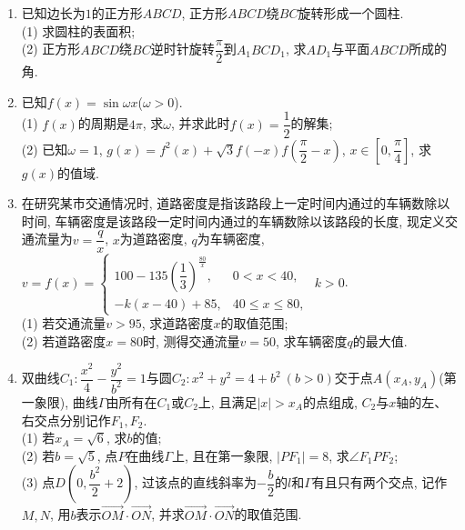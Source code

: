 \documentclass[10pt,a4paper]{article}
\begin{document}
\begin{enumerate}[1.]
\item 已知边长为$1$的正方形$ABCD$, 正方形$ABCD$绕$BC$旋转形成一个圆柱.\\
(1) 求圆柱的表面积;\\
(2) 正方形$ABCD$绕$BC$逆时针旋转$\dfrac{\pi}2$到$A_1BCD_1$, 求$AD_1$与平面$ABCD$所成的角.
\begin{center}
\end{center}
\item 已知$f(x)=\sin\omega x$($\omega>0$).\\
(1) $f(x)$的周期是$4\pi$, 求$\omega$, 并求此时$f(x)=\dfrac12$的解集;\\
(2) 已知$\omega=1$, $g(x)=f^2(x)+\sqrt3f(-x)f(\dfrac{\pi}2-x)$, $x\in [0,\dfrac{\pi}4]$, 求$g(x)$的值域.
\item 在研究某市交通情况时, 道路密度是指该路段上一定时间内通过的车辆数除以时间, 车辆密度是该路段一定时间内通过的车辆数除以该路段的长度, 现定义交通流量为$v=\dfrac qx$, $x$为道路密度, $q$为车辆密度, $v=f(x)=\begin{cases} 100-135(\dfrac13)^{\frac{80}x}, & 0<x<40,  \\ -k(x-40)+85, & 40 \le x\le 80, \end{cases}$ $k>0$.\\
(1) 若交通流量$v>95$, 求道路密度$x$的取值范围; \\
(2) 若道路密度$x=80$时, 测得交通流量$v=50$, 求车辆密度$q$的最大值.
\item 双曲线$C_1:\dfrac{x^2}4-\dfrac{y^2}{b^2}=1$与圆$C_2:x^2+y^2=4+b^2 \ (b>0)$交于点$A(x_A,y_A)$(第一象限), 曲线$\Gamma$由所有在$C_1$或$C_2$上, 且满足$|x|>x_A$的点组成, $C_2$与$x$轴的左、右交点分别记作$F_1,F_2$.\\
(1) 若$x_A=\sqrt6$, 求$b$的值;\\
(2) 若$b=\sqrt5$, 点$P$在曲线$\Gamma$上, 且在第一象限, $|PF_1|=8$, 求$\angle F_1PF_2$;\\
(3) 点$D(0,\dfrac{b^2}2+2)$, 过该点的直线斜率为$-\dfrac b2$的$l$和$\Gamma$有且只有两个交点, 记作$M,N$, 用$b$表示$\overrightarrow{OM}\cdot \overrightarrow{ON}$, 并求$\overrightarrow{OM}\cdot \overrightarrow{ON}$的取值范围.

\end{enumerate}
\end{document}
